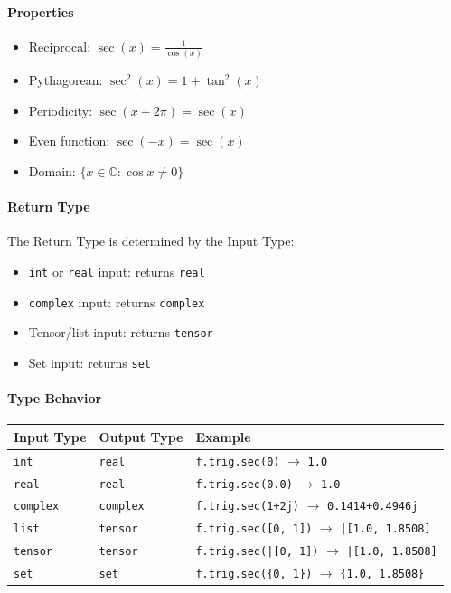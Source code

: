 \paragraph{Properties}
\begin{itemize}
\item Reciprocal: $\sec(x) = \frac{1}{\cos(x)}$
\item Pythagorean: $\sec^2(x) = 1 + \tan^2(x)$
\item Periodicity: $\sec(x + 2\pi) = \sec(x)$
\item Even function: $\sec(-x) = \sec(x)$
\item Domain: $\{x \in \mathbb{C} : \cos x \neq 0\}$
\end{itemize}

\paragraph{Return Type}
The Return Type is determined by the Input Type:
\begin{itemize}
\item \texttt{int} or \texttt{real} input: returns \texttt{real}
\item \texttt{complex} input: returns \texttt{complex}
\item Tensor/list input: returns \texttt{tensor}
\item Set input: returns \texttt{set}
\end{itemize}

\paragraph{Type Behavior}
\begin{center}
\begin{tabular}{lll}
\textbf{Input Type} & \textbf{Output Type} & \textbf{Example} \\ \hline
\texttt{int} & \texttt{real} & \texttt{f.trig.sec(0)} $\to$ \texttt{1.0} \\
\texttt{real} & \texttt{real} & \texttt{f.trig.sec(0.0)} $\to$ \texttt{1.0} \\
\texttt{complex} & \texttt{complex} & \texttt{f.trig.sec(1+2j)} $\to$ \texttt{0.1414+0.4946j} \\
\texttt{list} & \texttt{tensor} & \texttt{f.trig.sec([0, 1])} $\to$ \texttt{|[1.0, 1.8508]} \\
\texttt{tensor} & \texttt{tensor} & \texttt{f.trig.sec(|[0, 1])} $\to$ \texttt{|[1.0, 1.8508]} \\
\texttt{set} & \texttt{set} & \texttt{f.trig.sec(\{0, 1\})} $\to$ \texttt{\{1.0, 1.8508\}} \\
\end{tabular}
\end{center}

